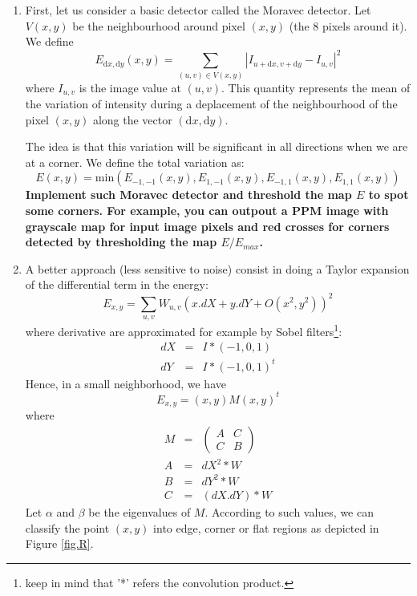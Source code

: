\documentclass[a4paper, 11pt, french]{article}
\begin{document}
\begin{enumerate}
 	\item First, let us consider a basic detector called the Moravec detector. Let  $V(x,y)$ be the neighbourhood around pixel $(x,y)$ (the 8 pixels around it). We define 
	\begin{equation}
	\label{eq1}
	E_{\mathrm{d}x,\mathrm{d}y}(x,y)=\sum_{(u,v)\in V(x,y)} \left|I_{u+\mathrm{d}x,v+\mathrm{d}y}-I_{u,v}\right|^2
	\end{equation}
	where $I_{u,v}$ is the image value at $(u,v)$. This quantity represents the mean of the variation of intensity during a deplacement of the neighbourhood of the pixel $(x,y)$ along the vector $(\mathrm{d}x,\mathrm{d}y)$.
	
 	The idea is that this variation will be significant in all directions when we are at a corner. We define the total variation as:
 	\begin{equation}
	\label{eq1b}
	E(x,y)=\mathrm{min}(E_{-1,-1}(x,y),E_{1,-1}(x,y),E_{-1,1}(x,y),E_{1,1}(x,y))
	\end{equation}
	{\bf Implement such Moravec detector and threshold the map $E$ to spot some corners. For example, you can outpout a PPM image with grayscale map  for input image pixels and red crosses for corners detected by thresholding the map $E/E_{max}$.}

	\item A better approach (less sensitive to noise) consist in doing a Taylor expansion of the differential term in the energy:
	\begin{equation}
		E_{x,y}=\sum_{u,v} W_{u,v}\left(x.dX+y.dY+O(x^2,y^2)\right)^2
	\end{equation}
	where derivative are approximated for example by Sobel filters\footnote{keep in mind that '*' refers the convolution product.}:
	\begin{eqnarray}
		dX & = & I * (-1,0,1) \\
		dY & = & I * (-1,0,1)^t
	\end{eqnarray}  
	Hence, in a  small neighborhood, we have 
	$$E_{x,y}=(x,y) M (x,y)^t$$ where
	\begin{eqnarray}
		M & = &\left(\begin{array}{cc} A & C\\ C & B\end{array}\right)\\
		A & = & dX^2 *  W \\
		B & = & dY^2 * W \\
		C & = & (dX.dY)*  W 
	\end{eqnarray}
	Let $\alpha$ and $\beta$ be the eigenvalues of $M$. According to such values, we can classify the point $(x,y)$ into edge, corner or flat regions as depicted in Figure \ref{fig.R}.


\end{enumerate}
\end{document}
